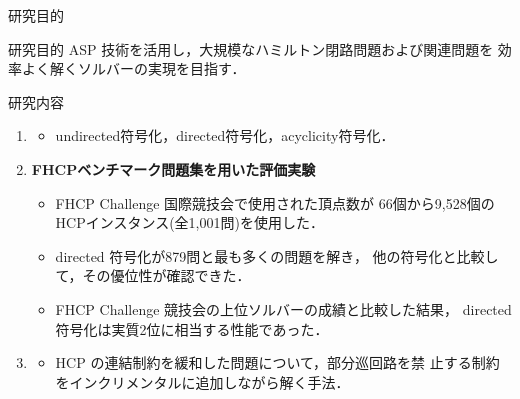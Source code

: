 \documentclass[dvipdfmx]{beamer}
\begin{document}
\begin{frame}{研究目的}
  \begin{alertblock}{研究目的}
    ASP 技術を活用し，大規模なハミルトン閉路問題および関連問題を
    効率よく解くソルバーの実現を目指す．
  \end{alertblock}
  \pause
  \begin{block}{研究内容}
   \begin{enumerate}
    \item {}
	  \begin{itemize}
	   \item \textsf{undirected}符号化，\textsf{directed}符号化，\textsf{acyclicity}符号化．
	  \end{itemize}
	  \pause
    \item \alert{\bf FHCPベンチマーク問題集を用いた評価実験}
	  \begin{itemize}
	   \item \alert{FHCP Challenge 国際競技会}で使用された頂点数が
		 66個から9,528個の HCPインスタンス(全1,001問)を使用した．
	   \item directed 符号化が879問と最も多くの問題を解き，
		 他の符号化と比較して，その優位性が確認できた．
	   \item FHCP Challenge 競技会の上位ソルバーの成績と比較した結果，
		 directed 符号化は\alert{実質2位}に相当する性能であった．
	  \end{itemize}
	  \pause
    \item {}
	  \begin{itemize}
	   \item HCP の連結制約を緩和した問題について，部分巡回路を禁
             止する制約をインクリメンタルに追加しながら解く手法．
	  \end{itemize}
   \end{enumerate}
  \end{block}
\end{frame}
\end{document}
